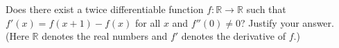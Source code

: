 Does there exist a twice differentiable function $f : \mathbb{R} \to
\mathbb{R}$ such that $f'(x) = f(x + 1) - f(x)$ for all $x$ and $f''(0) \neq
0$? Justify your answer. (Here $\mathbb{R}$ denotes the real numbers and $f'$
denotes the derivative of $f$.)
